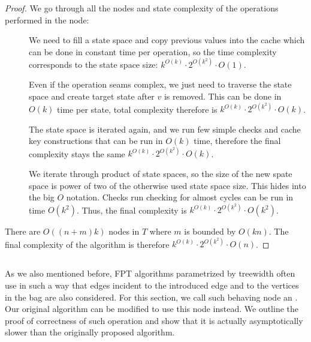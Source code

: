 \begin{proof}
	We go through all the nodes and state complexity of the operations performed in the node:
	\begin{description}
		\item[\IntroduceVertexNode{}]
		      We need to fill a state space and copy previous values into the cache
		      which can be done in constant time per operation,
		      so the time complexity corresponds to the state space size:
		      \( {k}^{O(k)} \cdot 2^{O(k^2)} \cdot O(1) \).
		\item[\ForgetVertexNode{}]
		      Even if the operation seams complex, we just need to traverse the state space
		      and create target state after \( v \) is removed. This can be done in \( O(k) \) time
		      per state, total complexity therefore is
		      \( {k}^{O(k)} \cdot 2^{O(k^2)} \cdot O(k) \).
		\item[\IntroduceEdgeNode{}]
		      The state space is iterated again, and we run few simple checks and cache key constructions
		      that can be run in \( O(k) \) time, therefore the final complexity stays the same
		      \( {k}^{O(k)} \cdot 2^{O(k^2)} \cdot O(k) \).
		\item[\JoinNode{}]
		      We iterate through product of state spaces,
		      so the size of the new spate space is power of two
		      of the otherwise used state space size.
		      This hides into the big \( O \) notation.
		      Checks run checking for almost cycles can be run in time \( O(k^2) \).
		      Thus, the final		complexity is
		      \( {k}^{O(k)} \cdot 2^{O(k^2)} \cdot O(k^2) \).
	\end{description}
	There are \( O((n+m)k) \) nodes in \( T \) where \( m \) is bounded by \( O(kn) \).
	The final complexity of the algorithm is therefore
	\( {k}^{O(k)} \cdot 2^{O(k^2)} \cdot O(n) \).
\end{proof}
%

\subsection{\IntroduceVertexWithEdgesNode{}}

As we also mentioned before, FPT algorithms parametrized by treewidth
often use \IntroduceVertexNode{} in such a way
that edges incident to the introduced edge and to
the vertices in the bag are also considered.
For this section, we call such behaving node an \IntroduceVertexWithEdgesNode{}.
Our original algorithm can be modified to use this node instead.
We outline the proof of correctness of such operation and show
that it is actually asymptotically slower than the originally proposed algorithm.


